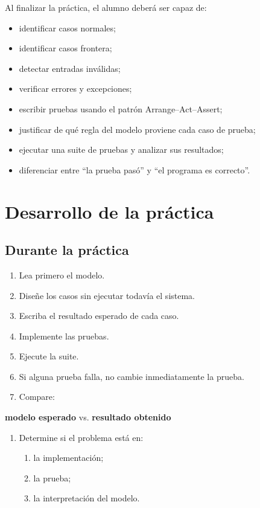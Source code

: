 \documentclass[11pt,letterpaper]{article}
\begin{document}
Al finalizar la práctica, el alumno deberá ser capaz de:

\begin{itemize}
\item identificar casos normales;
\item identificar casos frontera;
\item detectar entradas inválidas;
\item verificar errores y excepciones;
\item escribir pruebas usando el patrón Arrange–Act–Assert;
\item justificar de qué regla del modelo proviene cada caso de prueba;
\item ejecutar una suite de pruebas y analizar sus resultados;
\item diferenciar entre “la prueba pasó” y “el programa es correcto”.
\end{itemize}


\section{Desarrollo de la práctica}
\label{sec:org0d051cd}


\subsection{Durante la práctica}
\label{sec:org6cbfe18}

\begin{enumerate}
\item Lea primero el modelo.
\item Diseñe los casos sin ejecutar todavía el sistema.
\item Escriba el resultado esperado de cada caso.
\item Implemente las pruebas.
\item Ejecute la suite.
\item Si alguna prueba falla, no cambie inmediatamente la prueba.
\item Compare:
\end{enumerate}

\begin{center}


\textbf{modelo esperado} vs. \textbf{resultado obtenido}
\end{center}

\begin{enumerate}
\item Determine si el problema está en:
\begin{enumerate}
\item la implementación;
\item la prueba;
\item la interpretación del modelo.
\end{enumerate}
\end{enumerate}
\end{document}
